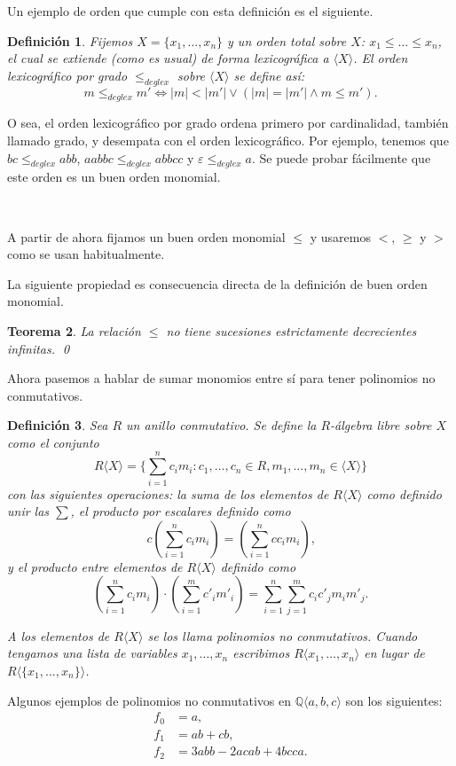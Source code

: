 \documentclass[12pt]{report}
\theoremstyle{customstyle}
\newtheorem{theorem}{Teorema}[chapter]
\newtheorem{definition}[theorem]{Definición}
\theoremstyle{factstyle}
\begin{document}
Un ejemplo de orden que cumple con esta definición es el siguiente.

\begin{definition}\label{def:orden lexicográfico por grado}
  Fijemos $X = \{x_1, …, x_n\}$ y un orden total sobre $X$: $x_1 ≤ … ≤ x_n$, el cual se extiende (como es usual) de forma lexicográfica a $⟨X⟩$. El orden lexicográfico por grado $ ≤_{deglex}$ sobre $⟨X⟩$ se define así:
  \[ m ≤_{deglex} m' ⇔ |m| < |m'| ∨ (|m| = |m'| ∧ m ≤ m') \text{.}\]
\end{definition}

O sea, el orden lexicográfico por grado ordena primero por cardinalidad, también llamado grado, y desempata con el orden lexicográfico. Por ejemplo, tenemos que $bc ≤_{deglex} abb$, $aabbc ≤_{deglex} abbcc$ y $ε ≤_{deglex} a$. Se puede probar fácilmente que este orden es un buen orden monomial.

\

A partir de ahora fijamos un buen orden monomial $≤$ y usaremos $<$, $≥$ y $>$ como se usan habitualmente.

La siguiente propiedad es consecuencia directa de la definición de buen orden monomial.

\begin{theorem}\label{thm:≤ no sucesiones dec inf}
  La relación $≤$ no tiene sucesiones estrictamente decrecientes infinitas.
  \qed
\end{theorem}

Ahora pasemos a hablar de sumar monomios entre sí para tener polinomios no conmutativos.

\begin{definition}
  Sea $R$ un anillo conmutativo. Se define la $R$-álgebra libre sobre $X$ como el conjunto
  \[ R⟨X⟩ = \{∑_{i = 1}^n c_i m_i : c_1, …, c_n ∈ R, m_1, …, m_n ∈ ⟨X⟩\}\]
  con las siguientes operaciones: la suma de los elementos de $R⟨X⟩$ como definido unir las $∑$, el producto por escalares definido como
  \[ c (∑_{i = 1}^n c_i m_i) = (∑_{i = 1}^n c c_i m_i) \text{,}\]
  y el producto entre elementos de $R⟨X⟩$ definido como
  \[ (∑_{i = 1}^n c_i m_i) · (∑_{i = 1}^m c'_i m'_i) = ∑_{i = 1}^n ∑_{j = 1}^m c_i c'_j m_i m'_j \text{.}\]

  A los elementos de $R⟨X⟩$ se los llama polinomios no conmutativos. Cuando tengamos una lista de variables $x_1, …, x_n$ escribimos $R⟨x_1, …, x_n⟩$ en lugar de $R⟨\{x_1, …, x_n\}⟩$.
\end{definition}

Algunos ejemplos de polinomios no conmutativos en $ℚ⟨a, b, c⟩$ son los siguientes:
\begin{align*}
  f_0 &= a \text{,} \\
  f_1 &= ab + cb \text{,} \\
  f_2 &= 3 abb - 2 acab + 4 bcca \text{.}
\end{align*}
\end{document}
